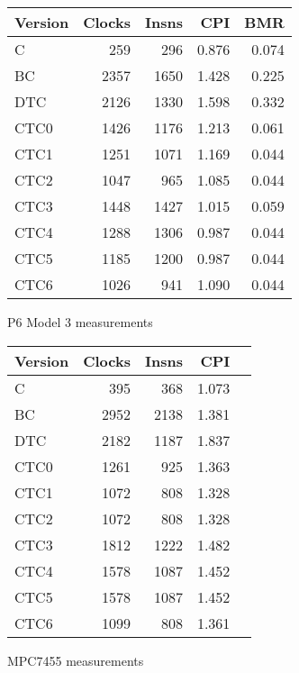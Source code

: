 \documentclass[10pt,a4paper]{article}
\begin{document}
\begin{figure}[htb]
\begin{center}
\begin{tabular}{|@{~}l|r|r|r|r|}
\hline
Version & Clocks & Insns & CPI & BMR \\
\hline
C    &  259 &  296 & 0.876 & 0.074 \\
BC   & 2357 & 1650 & 1.428 & 0.225 \\
DTC  & 2126 & 1330 & 1.598 & 0.332 \\
CTC0 & 1426 & 1176 & 1.213 & 0.061 \\
CTC1 & 1251 & 1071 & 1.169 & 0.044 \\
CTC2 & 1047 &  965 & 1.085 & 0.044 \\
CTC3 & 1448 & 1427 & 1.015 & 0.059 \\
CTC4 & 1288 & 1306 & 0.987 & 0.044 \\
CTC5 & 1185 & 1200 & 0.987 & 0.044 \\
CTC6 & 1026 &  941 & 1.090 & 0.044 \\
\hline
\end{tabular}
\end{center}
\caption{P6 Model 3 measurements}
\label{fig:measurements-p6m3}
\end{figure}

\begin{figure}[htb]
\begin{center}
\begin{tabular}{|@{~}l|r|r|r|r|}
\hline
Version & Clocks & Insns & CPI \\
\hline
C    &  395 &  368 & 1.073 \\
BC   & 2952 & 2138 & 1.381 \\
DTC  & 2182 & 1187 & 1.837 \\
CTC0 & 1261 &  925 & 1.363 \\
CTC1 & 1072 &  808 & 1.328 \\
CTC2 & 1072 &  808 & 1.328 \\
CTC3 & 1812 & 1222 & 1.482 \\
CTC4 & 1578 & 1087 & 1.452 \\
CTC5 & 1578 & 1087 & 1.452 \\
CTC6 & 1099 &  808 & 1.361 \\
\hline
\end{tabular}
\end{center}
\caption{MPC7455 measurements}
\label{fig:measurements-mpc7455}
\end{figure}
\end{document}
